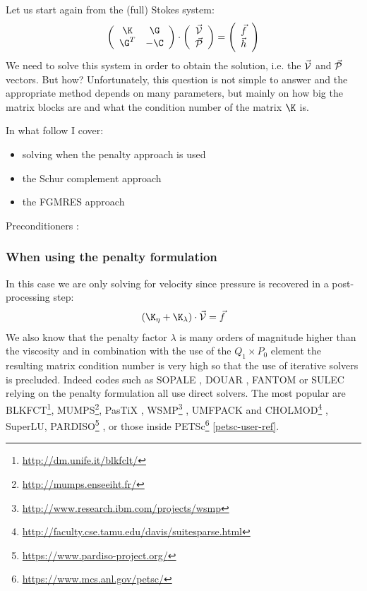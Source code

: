
Let us start again from the (full) Stokes system:
\begin{equation}
\left(
\begin{array}{cc}
\K & \G \\ \G^T & -\C 
\end{array}
\right)
\cdot
\left(
\begin{array}{c}
\vec{\cal V} \\ \vec{\cal P}
\end{array}
\right)
=
\left(
\begin{array}{c}
\vec{f} \\ \vec{h}
\end{array}
\right)
\label{StokesSyst}
\end{equation}
We need to solve this system in order to obtain the solution, i.e. the $\vec{\cal V}$ 
and $\vec{\cal P}$ vectors. But how? 
Unfortunately, this question is not simple to answer and the appropriate method depends on many 
parameters, but mainly on how big the matrix blocks are and what the condition number of the matrix $\K$ is. 

In what follow I cover:
\begin{itemize}
\item solving when the penalty approach is used
\item the Schur complement approach
\item the FGMRES approach \cite{deit13}
\end{itemize}

\Literature \cite{pasa75,mamo08,fumt11,knke04,kool00,kopo93} \cite{lane18}

Preconditioners \Literature: \cite{seuv10}

\subsubsection{When using the penalty formulation}

In this case we are only solving for 
velocity since pressure is recovered in a post-processing step:
\[
(\K_\eta+\K_\lambda) \cdot \vec {\cal V} = \vec f
\]
 We also know that 
the penalty factor $\lambda$ is many orders of magnitude higher than the viscosity and 
in combination with the use of the $Q_1 \times P_0$ element the resulting matrix 
condition number is very high so that the use of iterative solvers is precluded. 
Indeed codes such as SOPALE \cite{full95}, DOUAR \cite{brtf08}, FANTOM \cite{thie11} or SULEC \cite{qube11}
relying on the penalty formulation all use direct solvers.
The most popular are BLKFCT\footnote{\url{http://dm.unife.it/blkfclt/}}, 
MUMPS\footnote{\url{http://mumps.enseeiht.fr/}}\cite{amdu89,amdl00,amdk01,amgl06,ambl19}, 
PasTiX \cite{herr02},
WSMP\footnote{\url{http://www.research.ibm.com/projects/wsmp}} \cite{GUPTA94ieee,GUPTA09sc-long},
UMFPACK and CHOLMOD\footnote{\url{http://faculty.cse.tamu.edu/davis/suitesparse.html}}
, SuperLU, PARDISO\footnote{\url{https://www.pardiso-project.org/}}
\cite{pardiso-6.0a,pardiso-6.0b,pardiso-6.0c}, or those inside 
PETSc\footnote{\url{https://www.mcs.anl.gov/petsc/}} \ref{petsc-user-ref}.

